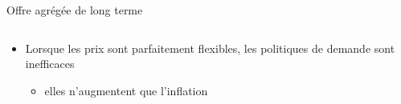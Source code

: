 \documentclass[
  ignorenonframetext,
  aspectratio=169,
]{beamer}
\providecommand{\tightlist}{%
  \setlength{\itemsep}{0pt}\setlength{\parskip}{0pt}}\usepackage{longtable,booktabs,array}
\begin{document}
\begin{frame}{Offre agrégée de long terme}
\begin{columns}[T]
\begin{column}{0.48\textwidth}
\begin{itemize}
  \begin{itemize}
  \tightlist
  \item
    ou l'offre avec des prix flexibles
  \item
    correspond à la vue classique
  \item
    est représentée comme une ligne verticale dans le plan \((\pi,y)\)
  \item
    est plus susceptible de se maintenir à long terme (les prix ont le
    temps de s'ajuster)
  \item
    est également appelée offre agrégée à long terme (LRAS)
  \end{itemize}
\item
  Lorsque les prix sont parfaitement flexibles, les politiques de
  demande sont inefficaces

  \begin{itemize}
  \tightlist
  \item
    elles n'augmentent que l'inflation
  \end{itemize}
\end{itemize}
\end{column}
\end{columns}
\end{frame}
\end{document}
